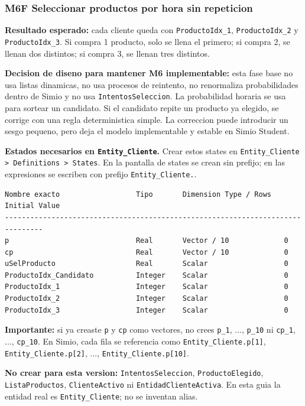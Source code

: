 \documentclass[11pt]{article}
\newcommand{\simio}[1]{\texttt{#1}}
\newcommand{\state}[1]{\texttt{#1}}
\begin{document}
\subsubsection{M6F Seleccionar productos por hora sin repeticion}
\textbf{Resultado esperado:} cada cliente queda con \state{ProductoIdx\_1}, \state{ProductoIdx\_2} y \state{ProductoIdx\_3}. Si compra 1 producto, solo se llena el primero; si compra 2, se llenan dos distintos; si compra 3, se llenan tres distintos.

\textbf{Decision de diseno para mantener M6 implementable:} esta fase base no usa listas dinamicas, no usa procesos de reintento, no renormaliza probabilidades dentro de Simio y no usa \state{IntentosSeleccion}. La probabilidad horaria se usa para sortear un candidato. Si el candidato repite un producto ya elegido, se corrige con una regla deterministica simple. La correccion puede introducir un sesgo pequeno, pero deja el modelo implementable y estable en Simio Student.

\textbf{Estados necesarios en \simio{Entity\_Cliente}.} Crear estos states en \simio{Entity\_Cliente > Definitions > States}. En la pantalla de states se crean sin prefijo; en las expresiones se escriben con prefijo \state{Entity\_Cliente.}.

\begin{lstlisting}[caption={States minimos de Entity Cliente para M6F}]
Nombre exacto                  Tipo       Dimension Type / Rows     Initial Value
-------------------------------------------------------------------------------
p                              Real       Vector / 10             0
cp                             Real       Vector / 10             0
uSelProducto                   Real       Scalar                  0
ProductoIdx_Candidato          Integer    Scalar                  0
ProductoIdx_1                  Integer    Scalar                  0
ProductoIdx_2                  Integer    Scalar                  0
ProductoIdx_3                  Integer    Scalar                  0
\end{lstlisting}

\textbf{Importante:} si ya creaste \state{p} y \state{cp} como vectores, no crees \state{p\_1}, ..., \state{p\_10} ni \state{cp\_1}, ..., \state{cp\_10}. En Simio, cada fila se referencia como \state{Entity\_Cliente.p[1]}, \state{Entity\_Cliente.p[2]}, ..., \state{Entity\_Cliente.p[10]}.

\textbf{No crear para esta version:} \state{IntentosSeleccion}, \state{ProductoElegido}, \state{ListaProductos}, \state{ClienteActivo} ni \state{EntidadClienteActiva}. En esta guia la entidad real es \simio{Entity\_Cliente}; no se inventan alias.
\end{document}
